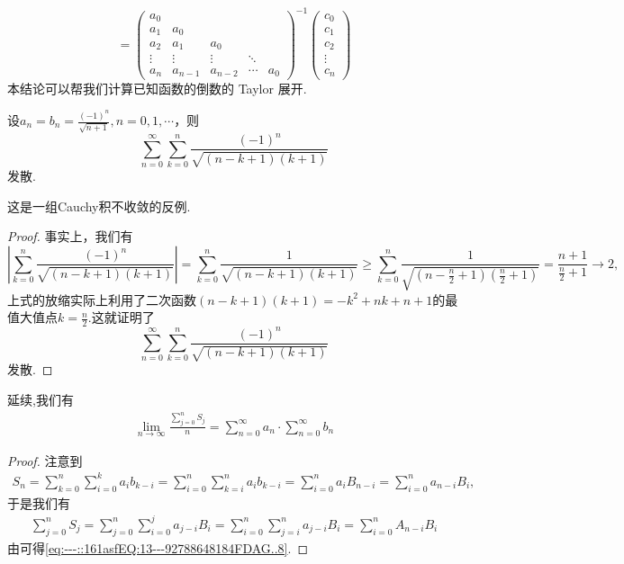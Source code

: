 \documentclass[../../main.tex]{subfiles}
\begin{document}
\begin{conclusion}
\[=
\begin{pmatrix}
a_0 \\
a_1 & a_0 \\
a_2 & a_1 & a_0 \\
\vdots & \vdots & \vdots & \ddots \\
a_n & a_{n-1} & a_{n-2} & \cdots & a_0
\end{pmatrix}^{-1}
\begin{pmatrix}
c_0 \\
c_1 \\
c_2 \\
\vdots \\
c_n
\end{pmatrix}
\]
本结论可以帮我们计算已知函数的倒数的 Taylor 展开.
\end{conclusion}


\begin{example}
设\(a_n = b_n = \frac{(-1)^n}{\sqrt{n + 1}}, n = 0,1,\cdots\)，则
\[
\sum_{n = 0}^{\infty} \sum_{k = 0}^{n} \frac{(-1)^n}{\sqrt{(n - k + 1)(k + 1)}}
\]
发散.
\end{example}
\begin{remark}
这是一组Cauchy积不收敛的反例.
\end{remark}
\begin{proof}
事实上，我们有
\[
\left| \sum_{k = 0}^{n} \frac{(-1)^n}{\sqrt{(n - k + 1)(k + 1)}} \right| = \sum_{k = 0}^{n} \frac{1}{\sqrt{(n - k + 1)(k + 1)}} \geqslant \sum_{k = 0}^{n} \frac{1}{\sqrt{\left(n - \frac{n}{2} + 1\right)\left(\frac{n}{2} + 1\right)}} = \frac{n + 1}{\frac{n}{2} + 1} \to 2,
\]
上式的放缩实际上利用了二次函数$\left( n-k+1 \right) \left( k+1 \right) =-k^2+nk+n+1$的最值大值点$k=\frac{n}{2}$.这就证明了
\[
\sum_{n = 0}^{\infty} \sum_{k = 0}^{n} \frac{(-1)^n}{\sqrt{(n - k + 1)(k + 1)}}
\]
发散.
\end{proof}

\begin{proposition}\label{proposition:命题3....4}
延续,我们有
\begin{align}
\lim\limits_{n\to\infty} \frac{\sum\limits_{j=0}^{n} S_j}{n} = \sum\limits_{n=0}^{\infty} a_n \cdot \sum\limits_{n=0}^{\infty} b_n
\label{eq:---::161asfEQ:13---92788648184FDAG..8}
\end{align}
\end{proposition}
\begin{proof}
注意到
\begin{align*}
S_n = \sum\limits_{k=0}^{n} \sum\limits_{i=0}^{k} a_i b_{k-i} = \sum\limits_{i=0}^{n} \sum\limits_{k=i}^{n} a_i b_{k-i} = \sum\limits_{i=0}^{n} a_i B_{n-i} = \sum\limits_{i=0}^{n} a_{n-i} B_i,
\end{align*}
于是我们有
\begin{align*}
\sum\limits_{j=0}^{n} S_j = \sum\limits_{j=0}^{n} \sum\limits_{i=0}^{j} a_{j-i} B_i = \sum\limits_{i=0}^{n} \sum\limits_{j=i}^{n} a_{j-i} B_i = \sum\limits_{i=0}^{n} A_{n-i} B_i
\end{align*}
由可得\eqref{eq:---::161asfEQ:13---92788648184FDAG..8}.
\end{proof}
\end{document}
